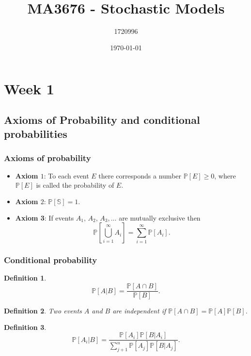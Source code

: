 \documentclass{article}
\title{MA3676 - Stochastic Models}
\author{1720996}
\date{\today}
\newtheorem{definition}{Definition}
\newcommand{\Prob}{\mathbb{P}}
\newcommand{\Space}{\mathbb{S}}
\begin{document}
\maketitle

\tableofcontents

\section{Week 1}
\subsection{Axioms of Probability and conditional probabilities}
\subsubsection{Axioms of probability}
\begin{itemize}
    \item \textbf{Axiom $1$}: To each event $E$ there corresponds a number $\Prob[E]\geq0$, where $\Prob[E]$ is called the probability of $E$.
    \item \textbf{Axiom $2$}: $\Prob[\Space]=1$.
    \item \textbf{Axiom 3}: If events $A_1,\,A_2,\,A_3,\ldots$ are mutually exclusive then
    \begin{equation}
        \Prob\left[ \bigcup_{i=1}^\infty A_i \right] = \sum_{i=1}^\infty \Prob[A_i].
    \end{equation}
\end{itemize}

\subsubsection{Conditional probability}
\begin{definition}
\begin{equation}
    \Prob[A\vert B]=\frac{\Prob[A\cap B]}{\Prob[B]}.
\end{equation}
\end{definition}

\begin{definition}
    Two events $A$ and $B$ are independent if $\Prob[A\cap B]=\Prob[A]\Prob[B]$.
\end{definition}

\begin{definition}
    \begin{equation}
        \Prob[A_i\vert B] = \frac{\Prob[A_i]\Prob[B\vert A_i]}{\sum_{j+1}^n\Prob[A_j]\Prob[B\vert A_j]}.
    \end{equation}
\end{definition}
\end{document}
